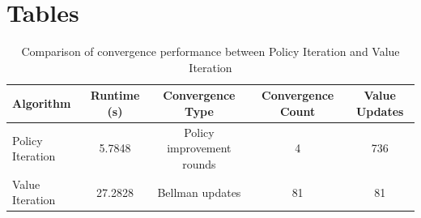 \documentclass[11pt,a4paper]{article}
\begin{document}
\clearpage
\section{Tables}

\begin{table}[ht]
\centering
\caption{Comparison of convergence performance between Policy Iteration and Value Iteration}
\label{tab:convergence}
\renewcommand{\arraystretch}{1.3}

\begin{tabular}{lcccc}
\hline
\textbf{Algorithm} & \textbf{Runtime (s)} & \textbf{Convergence Type} & \textbf{Convergence Count} & \textbf{Value Updates} \\
\hline
Policy Iteration & 5.7848 & Policy improvement rounds & 4  & 736 \\
Value Iteration  & 27.2828 & Bellman updates           & 81 & 81  \\
\hline
\end{tabular}

\end{table}

\clearpage
{}


\end{document}

